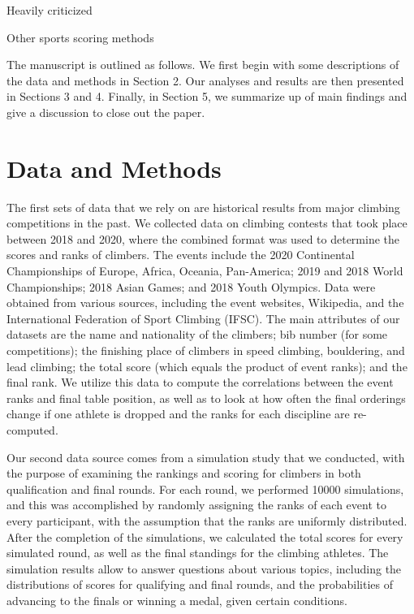 \documentclass[12pt]{article}
\begin{document}
Heavily criticized

Other sports scoring methods

The manuscript is outlined as follows. We first begin with some
descriptions of the data and methods in Section 2. Our analyses and
results are then presented in Sections 3 and 4. Finally, in Section 5,
we summarize up of main findings and give a discussion to close out the
paper.

\hypertarget{data-and-methods}{%
\section{Data and Methods}\label{data-and-methods}}

The first sets of data that we rely on are historical results from major
climbing competitions in the past. We collected data on climbing
contests that took place between 2018 and 2020, where the combined
format was used to determine the scores and ranks of climbers. The
events include the 2020 Continental Championships of Europe, Africa,
Oceania, Pan-America; 2019 and 2018 World Championships; 2018 Asian
Games; and 2018 Youth Olympics. Data were obtained from various sources,
including the event websites, Wikipedia, and the International
Federation of Sport Climbing (IFSC). The main attributes of our datasets
are the name and nationality of the climbers; bib number (for some
competitions); the finishing place of climbers in speed climbing,
bouldering, and lead climbing; the total score (which equals the product
of event ranks); and the final rank. We utilize this data to compute the
correlations between the event ranks and final table position, as well
as to look at how often the final orderings change if one athlete is
dropped and the ranks for each discipline are re-computed.

Our second data source comes from a simulation study that we conducted,
with the purpose of examining the rankings and scoring for climbers in
both qualification and final rounds. For each round, we performed 10000
simulations, and this was accomplished by randomly assigning the ranks
of each event to every participant, with the assumption that the ranks
are uniformly distributed. After the completion of the simulations, we
calculated the total scores for every simulated round, as well as the
final standings for the climbing athletes. The simulation results allow
to answer questions about various topics, including the distributions of
scores for qualifying and final rounds, and the probabilities of
advancing to the finals or winning a medal, given certain conditions.
\end{document}
